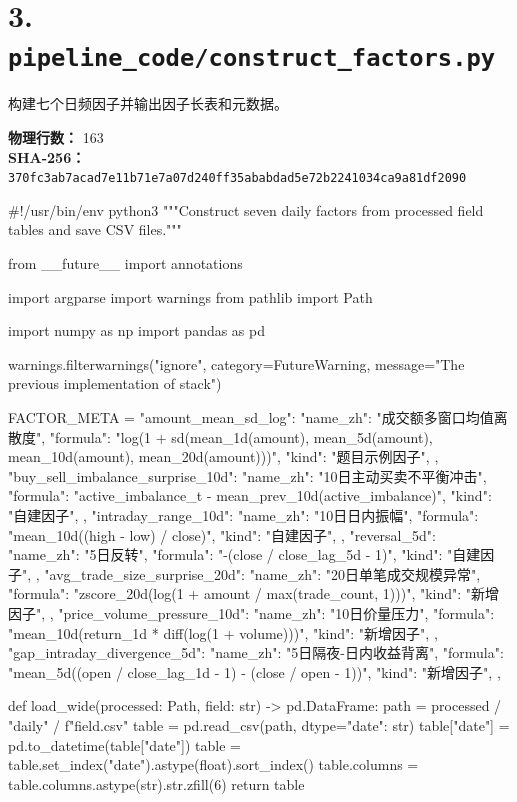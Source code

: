 \documentclass[UTF8,a4paper,fontset=fandol]{ctexart}
\begin{document}
\section{3. \texttt{pipeline\_code/construct\_factors.py}}
构建七个日频因子并输出因子长表和元数据。

\textbf{物理行数：} 163\\
\textbf{SHA-256：} \texttt{370fc3ab7acad7e11b71e7a07d240ff35ababdad5e72b2241034ca9a81df2090}

\begin{ProjectCode}
#!/usr/bin/env python3
"""Construct seven daily factors from processed field tables and save CSV files."""

from __future__ import annotations

import argparse
import warnings
from pathlib import Path

import numpy as np
import pandas as pd


warnings.filterwarnings("ignore", category=FutureWarning,
                        message="The previous implementation of stack")

FACTOR_META = {
    "amount_mean_sd_log": {
        "name_zh": "成交额多窗口均值离散度",
        "formula": "log(1 + sd(mean_1d(amount), mean_5d(amount), mean_10d(amount), mean_20d(amount)))",
        "kind": "题目示例因子",
    },
    "buy_sell_imbalance_surprise_10d": {
        "name_zh": "10日主动买卖不平衡冲击",
        "formula": "active_imbalance_t - mean_prev_10d(active_imbalance)",
        "kind": "自建因子",
    },
    "intraday_range_10d": {
        "name_zh": "10日日内振幅",
        "formula": "mean_10d((high - low) / close)",
        "kind": "自建因子",
    },
    "reversal_5d": {
        "name_zh": "5日反转",
        "formula": "-(close / close_lag_5d - 1)",
        "kind": "自建因子",
    },
    "avg_trade_size_surprise_20d": {
        "name_zh": "20日单笔成交规模异常",
        "formula": "zscore_20d(log(1 + amount / max(trade_count, 1)))",
        "kind": "新增因子",
    },
    "price_volume_pressure_10d": {
        "name_zh": "10日价量压力",
        "formula": "mean_10d(return_1d * diff(log(1 + volume)))",
        "kind": "新增因子",
    },
    "gap_intraday_divergence_5d": {
        "name_zh": "5日隔夜-日内收益背离",
        "formula": "mean_5d((open / close_lag_1d - 1) - (close / open - 1))",
        "kind": "新增因子",
    },
}


def load_wide(processed: Path, field: str) -> pd.DataFrame:
    path = processed / "daily" / f"{field}.csv"
    table = pd.read_csv(path, dtype={"date": str})
    table["date"] = pd.to_datetime(table["date"])
    table = table.set_index("date").astype(float).sort_index()
    table.columns = table.columns.astype(str).str.zfill(6)
    return table



\end{ProjectCode}
\end{document}
